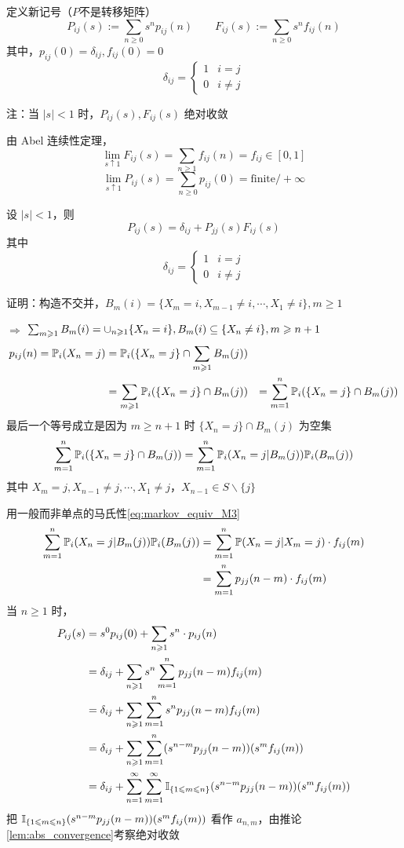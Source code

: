 定义新记号（$P$不是转移矩阵）
\[
P_{ij}(s):=\sum_{n\geq 0}s^n p_{ij}(n)\qquad F_{ij}(s):=\sum_{n\geq 0}s^n f_{ij}(n)
\]
其中，$p_{ij}(0)=\delta_{ij},f_{ij}(0)=0$
\[
\delta_{ij}=\begin{cases}
    1 & i=j\\
    0 & i\neq j
\end{cases}
\]

注：当 $|s|<1$ 时，$P_{ij}(s),F_{ij}(s)$ 绝对收敛

由 Abel 连续性定理，
\[
\lim_{s\uparrow 1}F_{ij}(s)=\sum_{n\geq 1}f_{ij}(n)=f_{ij}\in [0,1]
\]
\[
\lim_{s\uparrow 1}P_{ij}(s)=\sum_{n\geq 0}p_{ij}(0)=\text{finite}/+\infty
\]
\begin{lemma}
     设 $|s|<1$，则
    \[
    P_{ij}(s)=\delta_{ij}+P_{jj}(s)F_{ij}(s)
    \]
    其中
    \[
    \delta_{ij}=\begin{cases}
        1 & i=j\\
        0 & i\neq j
    \end{cases}
    \]
\end{lemma}

证明：构造不交并，$B_m(i)=\{X_m=i,X_{m-1}\neq i,\cdots,X_1\neq i\}, m\geq 1$

$\Rightarrow$ $\sum_{m\geqslant 1}B_m(i)=\cup_{n\geqslant 1}\{X_n=i\}, B_m(i)\subseteq \{X_n\neq i\}, m\geqslant n+1$
\[
\begin{aligned}
    p_{ij}(n)=\mathbb{P}_i(X_n=j)&=\mathbb{P}_i(\{X_n=j\}\cap \sum_{m\geqslant 1}B_m(j))\\
    &=\sum_{m\geqslant 1}\mathbb{P}_i(\{X_n=j\}\cap B_m(j))
    &=\sum_{m=1}^n\mathbb{P}_i(\{X_n=j\}\cap B_m(j))
\end{aligned}
\]
最后一个等号成立是因为 $m\geq n+1$ 时 $\{X_n=j\}\cap B_m(j)$ 为空集
\[
\sum_{m=1}^n\mathbb{P}_i(\{X_n=j\}\cap B_m(j))=\sum_{m=1}^n\mathbb{P}_i(X_n=j|B_m(j))\mathbb{P}_i(B_m(j))
\]
其中 $X_m=j,X_{n-1}\neq j,\cdots,X_1\neq j$，$X_{n-1}\in S\backslash \{j\}$

用一般而非单点的马氏性\eqref{eq:markov_equiv_M3}
\[
\begin{aligned}
    \sum_{m=1}^n\mathbb{P}_i(X_n=j|B_m(j))\mathbb{P}_i(B_m(j))&=\sum_{m=1}^n\mathbb{P}(X_n=j|X_m=j)\cdot f_{ij}(m)\\
    &=\sum_{m=1}^n p_{jj}(n-m)\cdot f_{ij}(m)
\end{aligned}
\]
当 $n\geq 1$ 时，
\[
\begin{aligned}
    P_{ij}(s)&=s^0p_{ij}(0)+\sum_{n\geqslant 1}s^n\cdot p_{ij}(n)\\
    &=\delta_{ij}+\sum_{n\geqslant 1}s^n\sum_{m=1}^n p_{jj}(n-m)f_{ij}(m)\\
    &=\delta_{ij}+\sum_{n\geqslant 1}\sum_{m=1}^n s^n p_{jj}(n-m)f_{ij}(m)\\
    &=\delta_{ij}+\sum_{n\geqslant 1}\sum_{m=1}^n(s^{n-m}p_{jj}(n-m))(s^m f_{ij}(m))\\
    &=\delta_{ij}+\sum_{n=1}^{\infty}\sum_{m=1}^{\infty}\mathbb I_{\{1\leqslant m\leqslant n\}}(s^{n-m}p_{jj}(n-m))(s^m f_{ij}(m))
\end{aligned}
\]
把 $\mathbb I_{\{1\leqslant m\leqslant n\}}(s^{n-m}p_{jj}(n-m))(s^m f_{ij}(m))$ 看作 $a_{n,m}$，由推论\ref{lem:abs_convergence}考察绝对收敛

